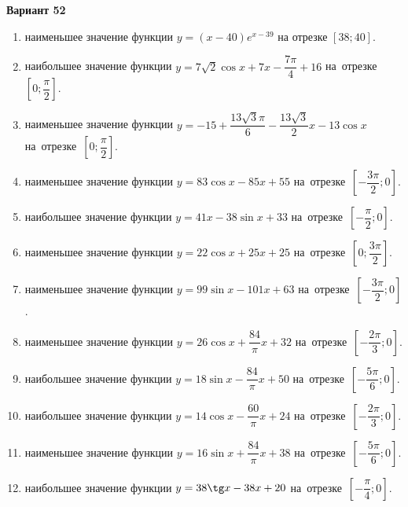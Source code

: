 \documentclass[a4paper,10pt]{article}
\begin{document}
\begin{center}\Large\textbf{Вариант 52}\end{center}

\begin{enumerate}
\item {} наименьшее значение функции $y = \left(x-40\right)e^{x-39}$ на отрезке $\left[38;40\right]$.

\item {} наибольшее значение функции $y = 7\sqrt{2}\cos x+7x-\dfrac{7\pi}{4} +16$ на~отрезке~$\left[0;\dfrac{\pi }{2}\right]$.

\item {} наименьшее значение функции $y = -15+\dfrac{13\sqrt{3} \pi}{6}-\dfrac{13\sqrt{3}}{2}x-13\cos x$ на~отрезке~$\left[0;\dfrac{\pi }{2}\right]$.

\item {} наименьшее значение функции $y = 83\cos x-85x+55$ на~отрезке~$\left[-\dfrac{3\pi }{2};0\right]$.

\item {} наибольшее значение функции $y = 41x-38\sin x+33$ на~отрезке~$\left[-\dfrac{\pi }{2};0\right]$.

\item {} наименьшее значение функции $y = 22\cos x+25x+25$ на~отрезке~$\left[0;\dfrac{3\pi }{2}\right]$.

\item {} наименьшее значение функции $y = 99\sin x-101x+63$ на~отрезке~$\left[-\dfrac{3\pi }{2};0\right]$.

\item {} наименьшее значение функции $y = 26\cos x+\dfrac{84}{\pi }x +32$ на~отрезке~$\left[-\dfrac{2\pi }{3};0\right]$.

\item {} наибольшее значение функции $y = 18\sin x-\dfrac{84}{\pi }x+50$ на~отрезке~$\left[-\dfrac{5\pi }{6};0\right]$.

\item {} наибольшее значение функции $y = 14\cos x-\dfrac{60}{\pi }x+24$ на~отрезке~$\left[-\dfrac{2\pi }{3};0\right]$.

\item {} наименьшее значение функции $y = 16\sin x+\dfrac{84}{\pi }x+38$ на~отрезке~$\left[-\dfrac{5\pi }{6};0\right]$.

\item {} наибольшее значение функции $y = 38\tg x-38x+20$ на~отрезке~$\left[-\dfrac{\pi }{4};0\right]$.


\end{enumerate}
\end{document}
